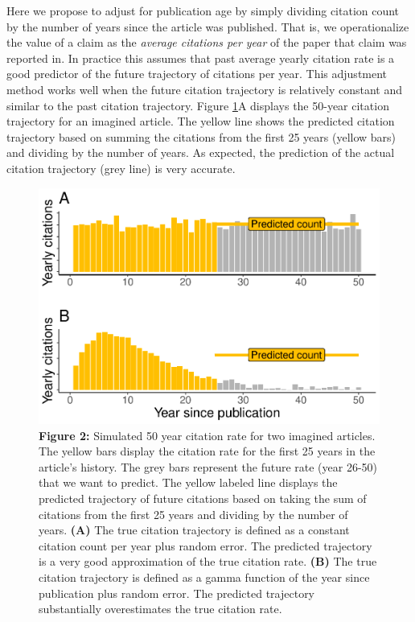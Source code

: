\documentclass[
  english,
  man,floatsintext]{apa6}
\begin{document}
Here we propose to adjust for publication age by simply dividing citation count by the number of years since the article was published. That is, we operationalize the value of a claim as the \emph{average citations per year} of the paper that claim was reported in. In practice this assumes that past average yearly citation rate is a good predictor of the future trajectory of citations per year. This adjustment method works well when the future citation trajectory is relatively constant and similar to the past citation trajectory. Figure \ref{fig:2}A displays the 50-year citation trajectory for an imagined article. The yellow line shows the predicted citation trajectory based on summing the citations from the first 25 years (yellow bars) and dividing by the number of years. As expected, the prediction of the actual citation trajectory (grey line) is very accurate.

\begin{figure}
\centering
\includegraphics{RVcn_manuscript_files/figure-latex/2-1.pdf}
\caption{\label{fig:2}\textbf{Figure 2:} Simulated 50 year citation rate for two imagined articles. The yellow bars display the citation rate for the first 25 years in the article's history. The grey bars represent the future rate (year 26-50) that we want to predict. The yellow labeled line displays the predicted trajectory of future citations based on taking the sum of citations from the first 25 years and dividing by the number of years. \textbf{(A)} The true citation trajectory is defined as a constant citation count per year plus random error. The predicted trajectory is a very good approximation of the true citation rate. \textbf{(B)} The true citation trajectory is defined as a gamma function of the year since publication plus random error. The predicted trajectory substantially overestimates the true citation rate.}
\end{figure}
\end{document}
